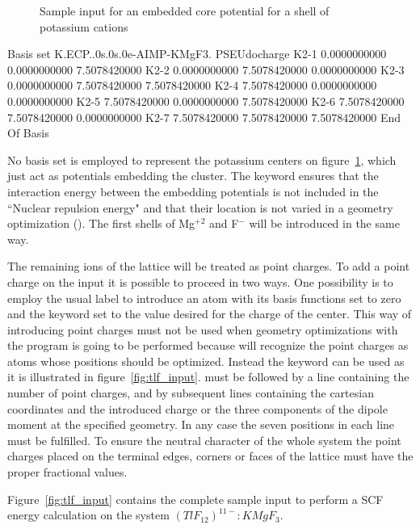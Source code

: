 \begin{figure}[h]
\caption{Sample input for an embedded core potential for a shell of potassium cations}
\label{fig:tlf_k}
\end{figure}
\begin{inputlisting}
Basis set
K.ECP..0s.0s.0e-AIMP-KMgF3. 
PSEUdocharge
K2-1    0.0000000000   0.0000000000   7.5078420000
K2-2    0.0000000000   7.5078420000   0.0000000000
K2-3    0.0000000000   7.5078420000   7.5078420000
K2-4    7.5078420000   0.0000000000   0.0000000000
K2-5    7.5078420000   0.0000000000   7.5078420000
K2-6    7.5078420000   7.5078420000   0.0000000000
K2-7    7.5078420000   7.5078420000   7.5078420000
End Of Basis
\end{inputlisting}

No basis set is employed to represent the potassium centers on figure~\ref{fig:tlf_k},
which just act as potentials embedding the cluster. The keyword
 ensures that the interaction energy between the embedding
potentials is not included in the ``Nuclear repulsion energy"
and that their location is not varied in a geometry optimization ().
The first shells of Mg$^{+2}$ and F$^-$ will be introduced in the same way. 

The remaining ions of the lattice will be treated as point charges.
To add a point charge on the  input it is possible to proceed
in two ways. One possibility is to employ the usual label to introduce an atom
with its basis functions set to zero and the keyword  set to the
value desired for the charge of the center. This way of introducing point charges must not be
used when geometry optimizations with the  program is going to
be performed because  will recognize the point charges as atoms
whose positions should be optimized. Instead the keyword  can be
used as it is illustrated in figure~\ref{fig:tlf_input}.  must
be followed by a line containing the number of point charges, and by subsequent
lines containing the cartesian coordinates and the introduced charge or the
three components of the dipole moment at the specified geometry. In any case
the seven positions in each line must be fulfilled. To ensure the neutral 
character of the whole system the point charges placed on the terminal edges,
corners or faces of the lattice must have the proper fractional values.

Figure~\ref{fig:tlf_input} contains the complete sample input to perform a
SCF energy calculation on the system $(TlF_{12})^{11-}:KMgF_3$.

